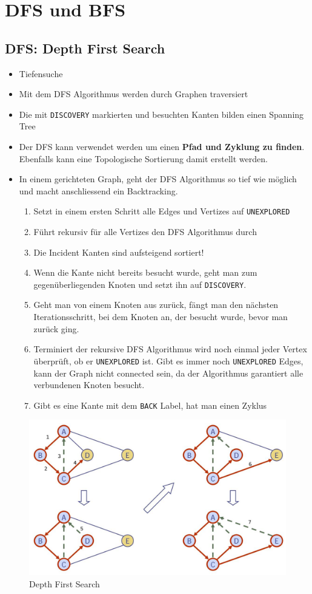\newpage

\section{DFS und BFS}
\subsection{DFS: Depth First Search}
\begin{itemize}
	\item Tiefensuche
	\item Mit dem DFS Algorithmus werden durch Graphen traversiert
	\item Die mit \lstinline|DISCOVERY| markierten und besuchten Kanten bilden einen Spanning Tree
	\item Der DFS kann verwendet werden um einen \textbf{Pfad und Zyklung zu finden}. Ebenfalls kann eine Topologische Sortierung damit erstellt werden.
	\item In einem gerichteten Graph, geht der DFS Algorithmus so tief wie möglich und macht anschliessend ein Backtracking. 
	\begin{enumerate}
		\item Setzt in einem ersten Schritt alle Edges und Vertizes auf \lstinline|UNEXPLORED|
		\item Führt rekursiv für alle Vertizes den DFS Algorithmus durch
		\item Die Incident Kanten sind aufsteigend sortiert!
		\item Wenn die Kante nicht bereits besucht wurde, geht man zum gegenüberliegenden Knoten und setzt ihn auf \lstinline|DISCOVERY|.
		\item Geht man von einem Knoten aus zurück, fängt man den nächsten Iterationsschritt, bei dem Knoten an, der besucht wurde, bevor man zurück ging.
		\item Terminiert der rekursive DFS Algorithmus wird noch einmal jeder Vertex überprüft, ob er \lstinline|UNEXPLORED| ist. Gibt es immer noch \lstinline|UNEXPLORED| Edges, kann der Graph nicht connected sein, da der Algorithmus garantiert alle verbundenen Knoten besucht.
		\item Gibt es eine Kante mit dem \lstinline|BACK| Label, hat man einen Zyklus
	\end{enumerate}
\end{itemize}

\begin{figure}[h!]
	\centering
	\includegraphics[width=0.7\linewidth]{images/dfs_example}
	\caption{Depth First Search}
	\label{fig:dfsexample}
\end{figure}

